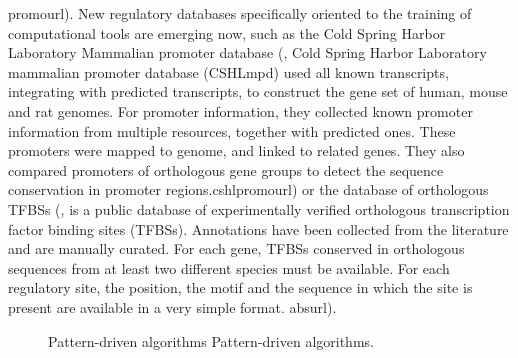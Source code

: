     {promourl}). 
New regulatory databases specifically oriented to the training of computational tools are emerging now, 
such as the Cold Spring Harbor Laboratory Mammalian promoter database 
(\citealp{xuan:2005a}, 
            {}
            {
	 Cold Spring Harbor Laboratory mammalian promoter database (CSHLmpd) used all known transcripts, 
	 integrating with predicted transcripts, to construct the gene set of human, mouse and rat genomes. 
	 For promoter information, they collected known promoter information from multiple resources, 
         together with predicted ones. These promoters were mapped to genome, and linked to related genes. 
	 They also compared promoters of orthologous gene groups to detect the sequence conservation in 
         promoter regions.}{cshlpromourl})
or the  database  of orthologous TFBSs 
(\citealp{blanco:2006a}, 
            {}
            { is a public database of experimentally verified orthologous transcription 
	     factor binding sites (TFBSs). Annotations have been collected from the literature and are 
             manually curated. For each gene, TFBSs conserved in orthologous sequences from at least 
	     two different species must be available. For each regulatory site, the position, the motif 
             and the sequence in which the site is present are available in a very simple format.}
             {absurl}).

\begin{figure}[t!]
\begin{center}
          {Pattern-driven algorithms}%
          {Pattern-driven algorithms.}%
          {}
\end{center}
\end{figure}

